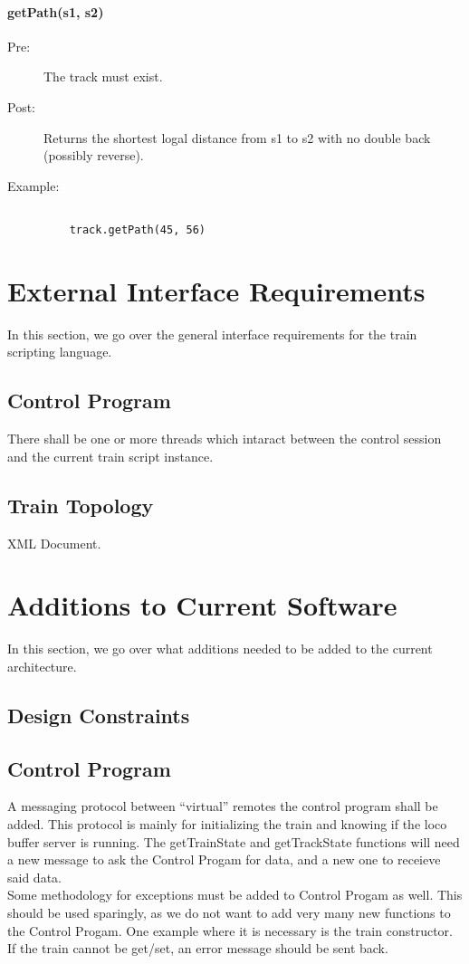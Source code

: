\documentclass[a4paper,11pt,notitlepage]{article}
\def\CS{Control Progam\xspace}
\begin{document}
\paragraph{getPath(s1, s2)}
\begin{description}
\item[\hspace{1cm}Pre:] The track must exist.

\item[\hspace{1cm}Post:] Returns the shortest logal distance from s1 to s2 with no double back (possibly reverse).
\item[\hspace{1cm}Example:]

\begin{verbatim}

    track.getPath(45, 56)
\end{verbatim}

\end{description}

\newpage
\section{External Interface Requirements}
    In this section, we go over the general interface requirements for the train scripting language.
\subsection{Control Program}
    There shall be one or more threads which intaract between the control session and the current train script instance.
\subsection{Train Topology}
    XML Document.

\newpage
\section{Additions to Current Software}
    In this section, we go over what additions needed to be added to the current architecture.
\subsection{Design Constraints}
\subsection{Control Program}
    A messaging protocol between ``virtual'' remotes the control program shall be added.  This protocol is mainly for initializing the train and knowing if the loco buffer server is running. The getTrainState and getTrackState functions will need a new message to ask the \CS for data, and a new one to receieve said data.
    \\Some methodology for exceptions must be added to \CS as well. This should be used sparingly, as we do not want to add very many new functions to the \CS. One example where it is necessary is the train constructor. If the train cannot be get/set, an error message should be sent back.
\end{document}
